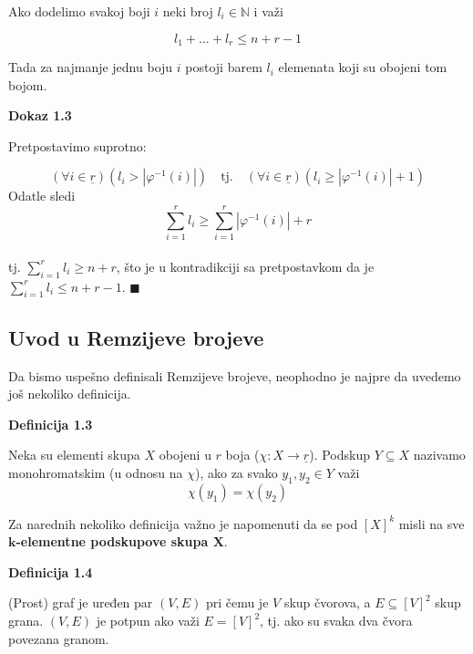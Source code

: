\documentclass[12pt,a4paper]{article}
\begin{document}
	\noindent Ako dodelimo svakoj boji $i$
	neki broj $l_{i} \in \mathbb{N}$ i važi
	\vspace{0.5em}

	\[l_{1}+\dots+l_{r} \leq n+r-1\]
	\vspace{0.5em}

	\noindent Tada za najmanje jednu boju $i$ postoji barem $l_{i}$ elemenata koji su obojeni tom bojom.

	\vspace{1.5em}

	{\noindent\fontsize{12pt}{12pt}\textbf{Dokaz 1.3}}
	\vspace{0.5em}

	\noindent Pretpostavimo suprotno:

	\[(\forall i \in \underline{r}) (l_{i} > |\varphi^{-1}(i)|) \quad \text{tj.}\quad (\forall i \in \underline{r})(l_{i} \geq |\varphi^{-1}(i)|+1)\]
	Odatle sledi \[ \sum_{i=1}^{r} l_{i} \geq \sum_{i=1}^{r}|\varphi^{-1}(i)|+r\] 
	\\tj. $ \sum_{i=1}^{r} l_{i} \geq n+r$,
	što je u kontradikciji sa pretpostavkom da je $\sum_{i=1}^{r} l_{i} \leq n+r-1$. $\blacksquare$

	\newpage
	\subsection{Uvod u Remzijeve brojeve}
	\vspace{1.5em}
	
	Da bismo uspešno definisali Remzijeve brojeve, neophodno je najpre da uvedemo još nekoliko definicija.

	\begin{mdframed}
	{\noindent\fontsize{12pt}{12pt}\textbf{Definicija 1.3}}
	\vspace{0.5em}

	\noindent Neka su elementi skupa $X$ obojeni u $r$ boja ($\chi : X \rightarrow \underline{r}$). Podskup $Y \subseteq X$ nazivamo monohromatskim (u odnosu na $\chi$), ako za svako $y_1, y_2 \in Y$ važi
	\[\chi(y_1) = \chi(y_2)\]
	\end{mdframed}
	\vspace{0.5em}
	
	\noindent Za narednih nekoliko definicija važno je napomenuti da se pod $[X]^{k}$ misli na sve \\ \textbf{$\textbf{k}$-elementne podskupove skupa $\textbf{X}$}.

	\begin{mdframed}
	{\noindent\fontsize{12pt}{12pt}\textbf{Definicija 1.4}}
	\vspace{0.5em}

	\noindent (Prost) graf je uređen par $(V, E)$ pri čemu je $V$ skup čvorova, a $E \subseteq [V]^{2}$ skup grana.
	$(V, E)$ je potpun ako važi $E = [V]^{2}$, tj. ako su svaka dva čvora povezana granom.
	\end{mdframed}
	\vspace{0.5em}
	
\end{document}
